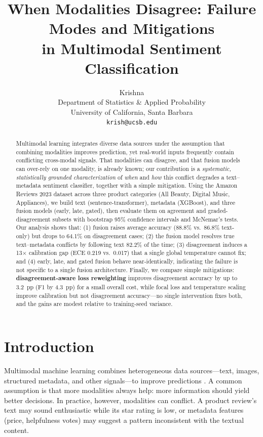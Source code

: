 \documentclass[11pt,a4paper]{article}
\title{When Modalities Disagree: Failure Modes and Mitigations\\in Multimodal Sentiment Classification}
\author{
  Krishna \\
  Department of Statistics \& Applied Probability \\
  University of California, Santa Barbara \\
  \texttt{krish@ucsb.edu}
}
\date{}
\begin{document}
\maketitle

\begin{abstract}
Multimodal learning integrates diverse data sources under the assumption that combining modalities improves prediction, yet real-world inputs frequently contain conflicting cross-modal signals.
That modalities can disagree, and that fusion models can over-rely on one modality, is already known; our contribution is a \emph{systematic, statistically grounded characterization} of \emph{when} and \emph{how} this conflict degrades a text--metadata sentiment classifier, together with a simple mitigation.
Using the Amazon Reviews 2023 dataset across three product categories (All Beauty, Digital Music, Appliances), we build text (sentence-transformer), metadata (XGBoost), and three fusion models (early, late, gated), then evaluate them on agreement and graded-disagreement subsets with bootstrap 95\% confidence intervals and McNemar's tests.
Our analysis shows that: (1) fusion raises average accuracy (88.8\% vs.\ 86.8\% text-only) but drops to 64.1\% on disagreement cases; (2) the fusion model resolves true text--metadata conflicts by following text 82.2\% of the time; (3) disagreement induces a 13$\times$ calibration gap (ECE 0.219 vs.\ 0.017) that a single global temperature cannot fix; and (4) early, late, and gated fusion behave near-identically, indicating the failure is not specific to a single fusion architecture.
Finally, we compare simple mitigations: \textbf{disagreement-aware loss reweighting} improves disagreement accuracy by up to 3.2~pp (F1 by 4.3~pp) for a small overall cost, while focal loss and temperature scaling improve calibration but not disagreement accuracy---no single intervention fixes both, and the gains are modest relative to training-seed variance.
\end{abstract}

\section{Introduction}

Multimodal machine learning combines heterogeneous data sources---text, images, structured metadata, and other signals---to improve predictions \citep{baltrusaitis2019multimodal}.
A common assumption is that more modalities always help: more information should yield better decisions.
In practice, however, modalities can conflict.
A product review's text may sound enthusiastic while its star rating is low, or metadata features (price, helpfulness votes) may suggest a pattern inconsistent with the textual content.
\end{document}
